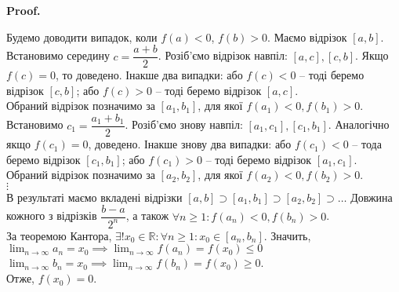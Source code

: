 \documentclass[a4paper, 14pt]{article}
\makeatletter
\def\qed{$\blacksquare$}
\theoremstyle{theoremdd}
\theoremstyle{theoremdd}
\theoremstyle{theoremdd}
\theoremstyle{theoremdd}
\theoremstyle{theoremdd}
\theoremstyle{theoremdd}
\theoremstyle{theoremdd}
\theoremstyle{theoremdd}
\renewenvironment{proof}[1][Proof.\\]{\par
\pushQED{\hfill \qed}%
\normalfont \topsep6\p@\@plus6\p@\relax
\trivlist
\item\relax
{\bfseries
#1\@addpunct{.}}\hspace\labelsep\ignorespaces
}{%
\popQED\endtrivlist\@endpefalse
}
\makeatother
\begin{document}
\begin{proof}
Будемо доводити випадок, коли $f(a) < 0$, $f(b) > 0$. Маємо відрізок $[a,b]$. \\ 
Встановимо середину $c = \dfrac{a+b}{2}$. Розіб'ємо відрізок навпіл: $[a, c], [c, b]$. Якщо $f(c) = 0$, то доведено. Інакше два випадки: або $f(c) < 0$ -- тоді беремо відрізок $[c,b]$; або $f(c) > 0$ -- тоді беремо відрізок $[a,c]$.\\
Обраний відрізок позначимо за $[a_1,b_1]$, для якої $f(a_1) < 0, f(b_1) > 0$.\\
Встановимо $c_1 = \dfrac{a_1+b_1}{2}$. Розіб'ємо знову навпіл: $[a_1,c_1],[c_1,b_1]$. Аналогічно якщо $f(c_1) = 0$, доведено. Інакше знову два випадки: або $f(c_1) < 0$ -- тода беремо відрізок $[c_1,b_1]$; або $f(c_1) > 0$ -- тоді беремо відрізок $[a_1,c_1]$.\\
Обраний відрізок позначимо за $[a_2,b_2]$, для якої $f(a_2) < 0, f(b_2) > 0$.\\
$\vdots$\\
В результаті маємо вкладені відрізки $[a,b] \supset [a_1,b_1] \supset [a_2,b_2] \supset \dots$ Довжина кожного з відрізків $\dfrac{b-a}{2^n}$, а також $\forall n \geq 1: f(a_n) < 0, f(b_n) > 0$.
\\ \iffalse %
\begin{figure}[H]
\centering
\begin{tikzpicture}
\draw[thick,->] (-0.5,0)--(4.5,0) node[anchor=north west] {$x$};
\draw[thick,->] (0,-1.5)--(0,2.5) node[anchor=east] {$y$};
\draw [thick] plot [smooth] coordinates {(0.5,-1) (1,-0.5) (1.2,-1.2) (1.8,0.5) (2.5,-0.3) (4, 2)} node[anchor = south] {$f(x)$};
\draw [dashed] (4,2)--(0,2) node[anchor = east] {$f(b)$};
\draw [dashed] (0.5,-1)--(0,-1) node[anchor = east] {$f(a)$};
\node[scale = 1.6, text opacity = 0.2] at (0.5,0) {$[$}; \node[scale = 1.6, text opacity = 0.2] at (4,0) {$]$}; %
\node[scale = 1.2, text opacity = 0.4] at (2.25,0) {$[$}; \node[scale = 1.2, text opacity = 0.4] at (4,0) {$]$}; %
\node[scale = 0.8, text opacity = 0.6] at (2.25,0) {$[$}; \node[scale = 0.8, text opacity = 0.6] at (3.125,0) {$]$}; %
\node[scale = 0.6, text opacity = 0.8] at (2.6875,0) {$[$}; \node[scale = 0.6, text opacity = 0.8] at (3.125,0) {$]$}; %
\node[scale = 0.4] at (2.6875,0) {$[$}; \node[scale = 0.4] at (2.90625,0) {$]$}; %
\draw[red] (2.76,0) circle (0.8pt) node[black, scale = 0.8] at (2.796,-0.5) {$x_0$};
\end{tikzpicture}
\end{figure}
\fi %
За теоремою Кантора, $\exists! x_0 \in \mathbb{R}: \forall n \geq 1: x_0 \in [a_n,b_n]$. Значить,\\
$\displaystyle\lim_{n \to \infty} a_n = x_0 \implies \displaystyle\lim_{n \to \infty} f(a_n) = f(x_0) \leq 0$\\
$\displaystyle\lim_{n \to \infty} b_n = x_0 \implies \displaystyle\lim_{n \to \infty} f(b_n) = f(x_0) \geq 0$.\\
Отже, $f(x_0) = 0$.
\end{proof}
\end{document}
